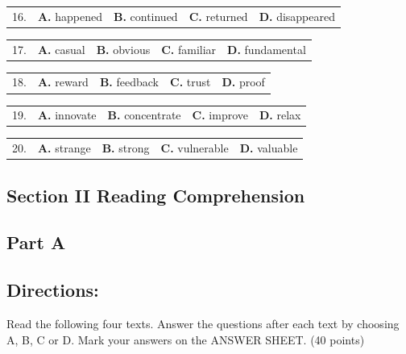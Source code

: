 \documentclass[UTF8,11pt]{ctexart}
\begin{document}
\noindent\begin{tabularx}{\linewidth}{@{}lXXXX@{}}16. & \textbf{A.} happened & \textbf{B.} continued & \textbf{C.} returned & \textbf{D.} disappeared\\\end{tabularx}\par

\noindent\begin{tabularx}{\linewidth}{@{}lXXXX@{}}17. & \textbf{A.} casual & \textbf{B.} obvious & \textbf{C.} familiar & \textbf{D.} fundamental\\\end{tabularx}\par

\noindent\begin{tabularx}{\linewidth}{@{}lXXXX@{}}18. & \textbf{A.} reward & \textbf{B.} feedback & \textbf{C.} trust & \textbf{D.} proof\\\end{tabularx}\par

\noindent\begin{tabularx}{\linewidth}{@{}lXXXX@{}}19. & \textbf{A.} innovate & \textbf{B.} concentrate & \textbf{C.} improve & \textbf{D.} relax\\\end{tabularx}\par

\noindent\begin{tabularx}{\linewidth}{@{}lXXXX@{}}20. & \textbf{A.} strange & \textbf{B.} strong & \textbf{C.} vulnerable & \textbf{D.} valuable\\\end{tabularx}\par

\subsection*{\textbf{Section II Reading Comprehension}}


\subsection*{\textbf{Part A}}


\subsection*{\textbf{Directions:}}


Read the following four texts. Answer the questions after each text by choosing A, B, C or D. Mark your answers on the ANSWER SHEET. (40 points)
\end{document}
